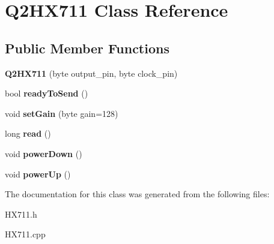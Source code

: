 \hypertarget{class_q2_h_x711}{\section{Q2\-H\-X711 Class Reference}
\label{class_q2_h_x711}
}
\subsection*{Public Member Functions}
\begin{DoxyCompactItemize}
\item 
\hypertarget{class_q2_h_x711_a208ccd48667f324db4147e6f9fb9de0b}{{\bfseries Q2\-H\-X711} (byte output\-\_\-pin, byte clock\-\_\-pin)}\label{class_q2_h_x711_a208ccd48667f324db4147e6f9fb9de0b}

\item 
\hypertarget{class_q2_h_x711_a256d004fa868e56797dabd8a8a715e99}{bool {\bfseries ready\-To\-Send} ()}\label{class_q2_h_x711_a256d004fa868e56797dabd8a8a715e99}

\item 
\hypertarget{class_q2_h_x711_a138e52716755008d82b5757817ca4c19}{void {\bfseries set\-Gain} (byte gain=128)}\label{class_q2_h_x711_a138e52716755008d82b5757817ca4c19}

\item 
\hypertarget{class_q2_h_x711_a54e05f8fe262121d17bcbfdb534ce1cf}{long {\bfseries read} ()}\label{class_q2_h_x711_a54e05f8fe262121d17bcbfdb534ce1cf}

\item 
\hypertarget{class_q2_h_x711_a2bcd4f4625b2bb90d0a5591543c03ed9}{void {\bfseries power\-Down} ()}\label{class_q2_h_x711_a2bcd4f4625b2bb90d0a5591543c03ed9}

\item 
\hypertarget{class_q2_h_x711_a32c55f1711c840bc3e6e210bc042b916}{void {\bfseries power\-Up} ()}\label{class_q2_h_x711_a32c55f1711c840bc3e6e210bc042b916}

\end{DoxyCompactItemize}


The documentation for this class was generated from the following files\-:\begin{DoxyCompactItemize}
\item 
H\-X711.\-h\item 
H\-X711.\-cpp\end{DoxyCompactItemize}
